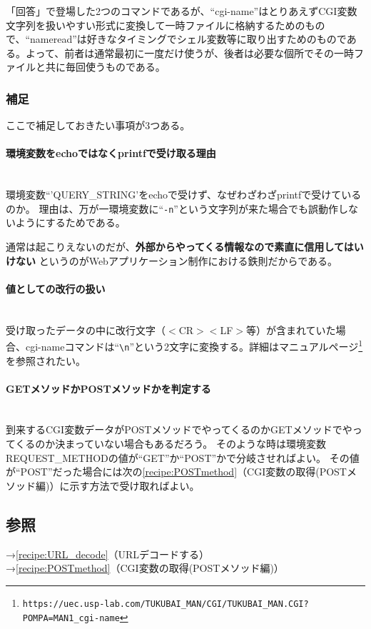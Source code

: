 「回答」で登場した2つのコマンドであるが、``cgi-name''はとりあえずCGI変数文字列を扱いやすい形式に変換して一時ファイルに格納するためのもので、``nameread''は好きなタイミングでシェル変数等に取り出すためのものである。よって、前者は通常最初に一度だけ使うが、後者は必要な個所でその一時ファイルと共に毎回使うものである。

\subsubsection*{補足}

ここで補足しておきたい事項が3つある。

\paragraph{環境変数をechoではなくprintfで受け取る理由}　\\
環境変数``'QUERY\_{}STRING'をechoで受けず、なぜわざわざprintfで受けているのか。
理由は、万が一環境変数に``\verb|-n|''という文字列が来た場合でも誤動作しないようにするためである。

通常は起こりえないのだが、\textbf{外部からやってくる情報なので素直に信用してはいけない}
というのがWebアプリケーション制作における鉄則だからである。

\paragraph{値としての改行の扱い}　\\
受け取ったデータの中に改行文字（$<$CR$>$$<$LF$>$等）が含まれていた場合、cgi-nameコマンドは``\verb|\n|''という2文字に変換する。詳細はマニュアルページ\footnote{\verb|https://uec.usp-lab.com/TUKUBAI_MAN/CGI/TUKUBAI_MAN.CGI?POMPA=MAN1_cgi-name|}を参照されたい。

\paragraph{GETメソッドかPOSTメソッドかを判定する}　\\
到来するCGI変数データがPOSTメソッドでやってくるのかGETメソッドでやってくるのか決まっていない場合もあるだろう。
そのような時は環境変数REQUEST\_{}METHODの値が``GET''か``POST''かで分岐させればよい。
その値が``POST''だった場合には次の\ref{recipe:POSTmethod}（CGI変数の取得(POSTメソッド編)）に示す方法で受け取ればよい。

\subsection*{参照}

\noindent
→\ref{recipe:URL_decode}（URLデコードする） \\
→\ref{recipe:POSTmethod}（CGI変数の取得(POSTメソッド編)）
